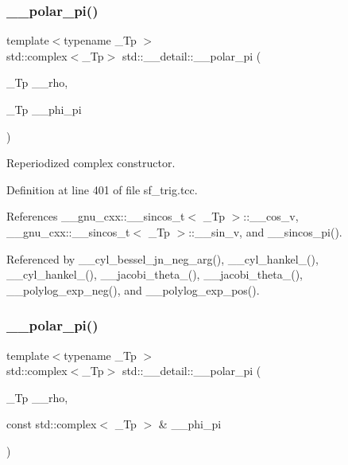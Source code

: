 \subsubsection{\texorpdfstring{\+\_\+\+\_\+polar\+\_\+pi()}{\_\_polar\_pi()}\hspace{0.1cm}{\footnotesize\ttfamily [1/2]}}
{\footnotesize\ttfamily template$<$typename \+\_\+\+Tp $>$ \\
std\+::complex$<$\+\_\+\+Tp$>$ std\+::\+\_\+\+\_\+detail\+::\+\_\+\+\_\+polar\+\_\+pi (\begin{DoxyParamCaption}\item[{\+\_\+\+Tp}]{\+\_\+\+\_\+rho,  }\item[{\+\_\+\+Tp}]{\+\_\+\+\_\+phi\+\_\+pi }\end{DoxyParamCaption})\hspace{0.3cm}{\ttfamily [inline]}}

Reperiodized complex constructor. 

Definition at line 401 of file sf\+\_\+trig.\+tcc.



References \+\_\+\+\_\+gnu\+\_\+cxx\+::\+\_\+\+\_\+sincos\+\_\+t$<$ \+\_\+\+Tp $>$\+::\+\_\+\+\_\+cos\+\_\+v, \+\_\+\+\_\+gnu\+\_\+cxx\+::\+\_\+\+\_\+sincos\+\_\+t$<$ \+\_\+\+Tp $>$\+::\+\_\+\+\_\+sin\+\_\+v, and \+\_\+\+\_\+sincos\+\_\+pi().



Referenced by \+\_\+\+\_\+cyl\+\_\+bessel\+\_\+jn\+\_\+neg\+\_\+arg(), \+\_\+\+\_\+cyl\+\_\+hankel\+\_(), \+\_\+\+\_\+cyl\+\_\+hankel\+\_(), \+\_\+\+\_\+jacobi\+\_\+theta\+\_(), \+\_\+\+\_\+jacobi\+\_\+theta\+\_(), \+\_\+\+\_\+polylog\+\_\+exp\+\_\+neg(), and \+\_\+\+\_\+polylog\+\_\+exp\+\_\+pos().

\mbox{\label{namespacestd_1_1____detail_a627c0e19f6b3e90af25735f351662d53}} 
\subsubsection{\texorpdfstring{\+\_\+\+\_\+polar\+\_\+pi()}{\_\_polar\_pi()}\hspace{0.1cm}{\footnotesize\ttfamily [2/2]}}
{\footnotesize\ttfamily template$<$typename \+\_\+\+Tp $>$ \\
std\+::complex$<$\+\_\+\+Tp$>$ std\+::\+\_\+\+\_\+detail\+::\+\_\+\+\_\+polar\+\_\+pi (\begin{DoxyParamCaption}\item[{\+\_\+\+Tp}]{\+\_\+\+\_\+rho,  }\item[{const std\+::complex$<$ \+\_\+\+Tp $>$ \&}]{\+\_\+\+\_\+phi\+\_\+pi }\end{DoxyParamCaption})\hspace{0.3cm}{\ttfamily [inline]}}

